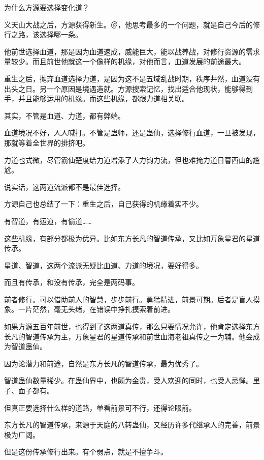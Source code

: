 
\begin{this_body}

为什么方源要选择变化道？

义天山大战之后，方源获得新生。＠，他思考最多的一个问题，就是自己今后的修行之路，该选择哪一条。

他前世选择血道，那是因为血道速成，威能巨大，能以战养战，对修行资源的需求量较少。而且前世他就这一个像样的机缘，对他而言，血道发展的前途最大。

重生之后，抛弃血道选择力道，是因为这不是五域乱战时期，秩序井然，血道没有出头之日。另一个原因是境遇造就。方源搜索记忆，找出适合他现状，能够得到手，并且能够运用的机缘。而这些机缘，都跟力道相关联。

其实，不管是血道、力道，都有弊端。

血道境况不好，人人喊打。不管是蛊师，还是蛊仙，选择修行血道，一旦被发现，那就等着全世界的排挤吧。

力道也式微，尽管霸仙楚度给力道增添了人力钧力流，但也难掩力道日暮西山的尴尬。

说实话，这两道流派都不是最佳选择。

方源自己也总结了一下：重生之后，自己获得的机缘着实不少。

有智道，有运道，有偷道……

这些机缘，有部分都极为优异。比如东方长凡的智道传承，又比如万象星君的星道传承。

星道、智道，这两个流派无疑比血道、力道的境况，要好得多。

而且有传承，和没有传承，完全是两码事。

前者修行。可以借助前人的智慧，步步前行。勇猛精进，前景可期。后者是盲人摸象。一片茫然，毫无头绪，在错误中挣扎摸索着前进。

如果方源五百年前世，也得到了这两道真传，那么只要情况允许，他肯定选择东方长凡的智道传承为主，万象星君的星道传承和前世血海老祖真传之一为辅。他会成为智道蛊仙。

因为论潜力和前途，自然是东方长凡的智道传承，最为优秀了。

智道蛊仙数量稀少。在蛊仙界中，也颇为金贵，受人欢迎的同时，也受人忌惮。里子、面子都有。

但真正要选择什么样的道路，单看前景可不行，还得论眼前。

东方长凡的智道传承，来源于天庭的八转蛊仙，又经历许多代继承人的完善，前景极为广阔。

但是这份传承修行出来。有个弱点，就是不擅争斗。


\end{this_body}
